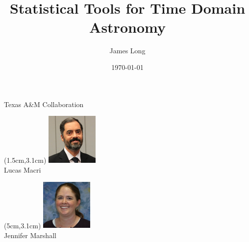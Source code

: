 \documentclass[12pt]{beamer}
\title{Statistical Tools for Time Domain Astronomy}
\author{James Long}
\institute{Texas A\&M University}
\date{\today}
\newcommand{\w}{1in}
\newcommand{\h}{1in}
\begin{document}
\frame{\titlepage}

\frame{\tableofcontents}





\begin{frame}{Texas A\&M Collaboration}



  \begin{textblock*}{3cm}(1.5cm,3.1cm) %
\includegraphics[width=\w,height=\h]{figs/Macri.jpg}\\
Lucas Macri
\end{textblock*}


  \begin{textblock*}{3cm}(5cm,3.1cm) %
\includegraphics[width=\w,height=\h]{figs/marshall.jpg}\\
Jennifer Marshall
\end{textblock*}


\end{frame}
\end{document}
